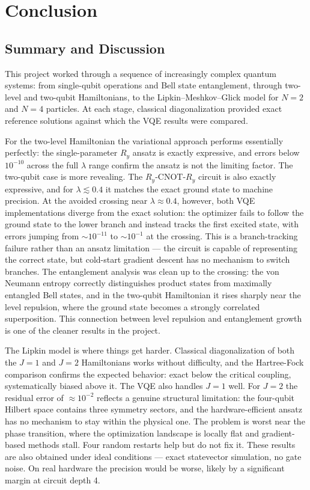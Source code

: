 \section{Conclusion}\label{sec:conclusion}

\subsection{Summary and Discussion}
\label{subsec:conclusion-summary}

This project worked through a sequence of increasingly complex quantum systems: from single-qubit operations and Bell state entanglement, through two-level and two-qubit Hamiltonians, to the Lipkin--Meshkov--Glick model for $N=2$ and $N=4$ particles. At each stage, classical diagonalization provided exact reference solutions against which the VQE results were compared.

For the two-level Hamiltonian the variational approach performs essentially perfectly: the single-parameter $R_y$ ansatz is exactly expressive, and errors below $10^{-10}$ across the full $\lambda$ range confirm the ansatz is not the limiting factor. The two-qubit case is more revealing. The $R_y$-CNOT-$R_y$ circuit is also exactly expressive, and for $\lambda\lesssim0.4$ it matches the exact ground state to machine precision. At the avoided crossing near $\lambda\approx0.4$, however, both VQE implementations diverge from the exact solution: the optimizer fails to follow the ground state to the lower branch and instead tracks the first excited state, with errors jumping from $\sim10^{-11}$ to $\sim10^{-1}$ at the crossing. This is a branch-tracking failure rather than an ansatz limitation — the circuit is capable of representing the correct state, but cold-start gradient descent has no mechanism to switch branches. The entanglement analysis was clean up to the crossing: the von Neumann entropy correctly distinguishes product states from maximally entangled Bell states, and in the two-qubit Hamiltonian it rises sharply near the level repulsion, where the ground state becomes a strongly correlated superposition. This connection between level repulsion and entanglement growth is one of the cleaner results in the project.

The Lipkin model is where things get harder. Classical diagonalization of both the $J=1$ and $J=2$ Hamiltonians works without difficulty, and the Hartree-Fock comparison confirms the expected behavior: exact below the critical coupling, systematically biased above it. The VQE also handles $J=1$ well. For $J=2$ the residual error of $\approx10^{-2}$ reflects a genuine structural limitation: the four-qubit Hilbert space contains three symmetry sectors, and the hardware-efficient ansatz has no mechanism to stay within the physical one. The problem is worst near the phase transition, where the optimization landscape is locally flat and gradient-based methods stall. Four random restarts help but do not fix it. These results are also obtained under ideal conditions — exact statevector simulation, no gate noise. On real hardware the precision would be worse, likely by a significant margin at circuit depth 4.

